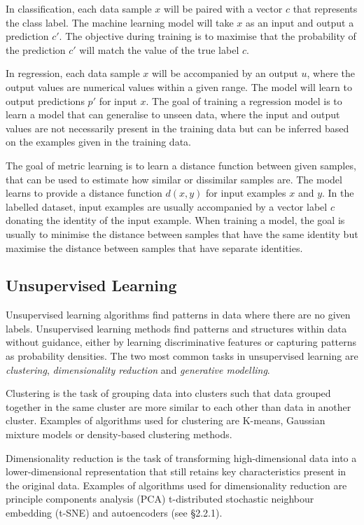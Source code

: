 In classification, each data sample $x$ will be paired with a vector $c$ that represents the class label. 
The machine learning model will take $x$ as an input and output a prediction $c'$. 
The objective during training is to maximise that the probability of the prediction $c'$ will match the value of the true label $c$. 

In regression, each data sample $x$ will be accompanied by an output $u$, where the output values are numerical values within a given range. 
The model will learn to output predictions $p'$ for input $x$. The goal of training a regression model is to learn a model that can generalise to unseen data, where the input and output values are not necessarily present in the training data but can be inferred based on the examples given in the training data. 

The goal of metric learning is to learn a distance function between given samples, that can be used to estimate how similar or dissimilar samples are. 
The model learns to provide a distance function $d(x,y)$ for input examples $x$ and $y$. In the labelled dataset, input examples are usually accompanied by a vector label $c$ donating the identity of the input example. 
When training a model, the goal is usually to minimise the distance between samples that have the same identity but maximise the distance between samples that have separate identities.

\subsection{Unsupervised Learning}

Unsupervised learning algorithms find patterns in data where there are no given labels. 
Unsupervised learning methods find patterns and structures within data without guidance, either by learning discriminative features or capturing patterns as probability densities. 
The two most common tasks in unsupervised learning are \textit{clustering}, \textit{dimensionality reduction} and \textit{generative modelling}.

Clustering is the task of grouping data into clusters such that data grouped together in the same cluster are more similar to each other than data in another cluster. 
Examples of algorithms used for clustering are K-means, Gaussian mixture models or density-based clustering methods.

Dimensionality reduction is the task of transforming high-dimensional data into a lower-dimensional representation that still retains key characteristics present in the original data. 
Examples of algorithms used for dimensionality reduction are principle components analysis (PCA) t-distributed stochastic neighbour embedding (t-SNE) and autoencoders (see \S2.2.1). 

